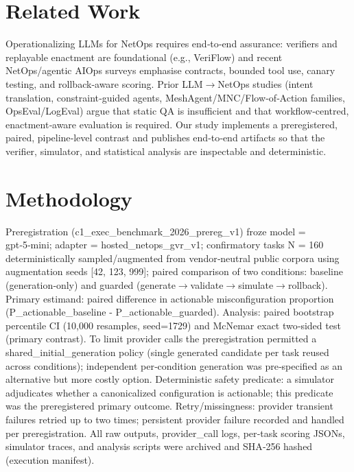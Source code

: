 \documentclass[conference]{IEEEtran}
\begin{document}
\section{Related Work}
Operationalizing LLMs for NetOps requires end‑to‑end assurance: verifiers and replayable enactment are foundational (e.g., VeriFlow) and recent NetOps/agentic AIOps surveys emphasise contracts, bounded tool use, canary testing, and rollback‑aware scoring. Prior LLM\ensuremath{\rightarrow}NetOps studies (intent translation, constraint‑guided agents, MeshAgent/MNC/Flow‑of‑Action families, OpsEval/LogEval) argue that static QA is insufficient and that workflow‑centred, enactment‑aware evaluation is required. Our study implements a preregistered, paired, pipeline‑level contrast and publishes end‑to‑end artifacts so that the verifier, simulator, and statistical analysis are inspectable and deterministic.

\section{Methodology}
Preregistration (c1\_exec\_benchmark\_2026\_prereg\_v1) froze model = gpt‑5‑mini; adapter = hosted\_netops\_gvr\_v1; confirmatory tasks N = 160 deterministically sampled/augmented from vendor‑neutral public corpora using augmentation seeds [42, 123, 999]; paired comparison of two conditions: baseline (generation‑only) and guarded (generate\ensuremath{\rightarrow}validate\ensuremath{\rightarrow}simulate\ensuremath{\rightarrow}rollback). Primary estimand: paired difference in actionable misconfiguration proportion (P\_actionable\_baseline - P\_actionable\_guarded). Analysis: paired bootstrap percentile CI (10,000 resamples, seed=1729) and McNemar exact two‑sided test (primary contrast). To limit provider calls the preregistration permitted a shared\_initial\_generation policy (single generated candidate per task reused across conditions); independent per‑condition generation was pre‑specified as an alternative but more costly option. Deterministic safety predicate: a simulator adjudicates whether a canonicalized configuration is actionable; this predicate was the preregistered primary outcome. Retry/missingness: provider transient failures retried up to two times; persistent provider failure recorded and handled per preregistration. All raw outputs, provider\_call logs, per‑task scoring JSONs, simulator traces, and analysis scripts were archived and SHA‑256 hashed (execution manifest).
\end{document}
